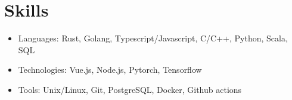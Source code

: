 \documentclass[letterpaper,11pt]{article}
\newcommand{\resumeItem}[2]{
  \item\small{#1{: #2}} \vspace{-2pt}
}
\newcommand{\resumeSubItem}[2]{\resumeItem{#1}{#2} \vspace{-2pt}}
\newcommand{\resumeListStart}{\vspace{-2pt}\begin{itemize}[leftmargin=*]}
\newcommand{\resumeListEnd}{\end{itemize}}
\begin{document}
\section{Skills}
  \resumeListStart
    \resumeSubItem{Languages}{Rust, Golang, Typescript/Javascript, C/C++, Python, Scala, SQL}
    \resumeSubItem{Technologies}{Vue.js, Node.js, Pytorch, Tensorflow}
    \resumeSubItem{Tools}{Unix/Linux, Git, PostgreSQL, Docker, Github actions}
  \resumeListEnd

\end{document}
